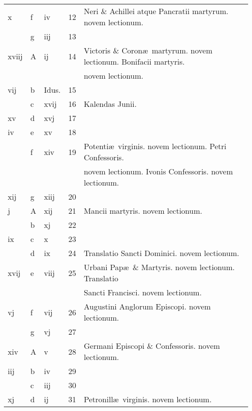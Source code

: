\documentclass[letter,11pt]{book}
\begin{document}
\begin{center}
\begin{tabular}{l | l | l | r | l}
\color{Red} x & f & \color{Red} iv & 12 & Neri \& Achillei atque Pancratii martyrum. \color{Red} novem lectionum. \\
\color{Red}  & g & \color{Red} iij & 13 & \\
\color{Red} xviij & \color{Red} A & \color{Red} ij & 14 & Victoris \& Coron\ae \ martyrum. \color{Red} novem lectionum. \color{black} Bonifacii martyris. \\
 &  &  &  & \quad \color{Red} novem lectionum. \\
\color{Red} vij & b & Idus. & 15 & \\
\color{Red}  & c & \color{Red} xvij & 16 & \qquad \color{Red} Kalendas Junii. \\
\color{Red} xv & d & \color{Red} xvj & 17 & \\
\color{Red} iv & e & \color{Red} xv & 18 & \\
\color{Red}  & f & \color{Red} xiv & 19 & Potenti\ae \ virginis. \color{Red} novem lectionum. \color{black} Petri Confessoris. \\
 &  &  &  & \quad \color{Red} novem lectionum. Ivonis Confessoris. \color{Red} novem lectionum. \\%
\color{Red} xij & g & \color{Red} xiij & 20 & \\
\color{Red} j & \color{Red} A & \color{Red} xij & 21 & Mancii martyris. \color{Red} novem lectionum. \\
\color{Red}  & b & \color{Red} xj & 22 & \\
\color{Red} ix & c & \color{Red} x & 23 & \\
\color{Red}  & d & \color{Red} ix & 24 & Translatio Sancti Dominici. \color{Red} novem lectionum. \\
\color{Red} xvij & e & \color{Red} viij & 25 & Urbani Pap\ae \ \& Martyris. \color{Red} novem lectionum. \color{black} Translatio \\
 &  &  &  & \quad Sancti Francisci. \color{Red} novem lectionum. \\
\color{Red} vj & f & \color{Red} vij & 26 & Augustini Anglorum Episcopi. \color{Red} novem lectionum. \\
\color{Red}  & g & \color{Red} vj & 27 & \\
\color{Red} xiv & \color{Red} A & \color{Red} v & 28 & Germani Episcopi \& Confessoris. \color{Red} novem lectionum. \\
\color{Red} iij & b & \color{Red} iv & 29 & \\
\color{Red}  & c & \color{Red} iij & 30 & \\
\color{Red} xj & d & \color{Red} ij & 31 & Petronill\ae \ virginis. \color{Red} novem lectionum. \\
\end{tabular}
\end{center}
\end{document}

